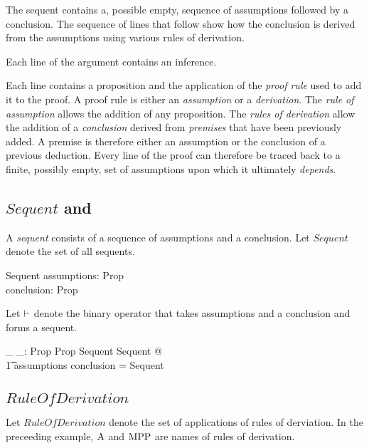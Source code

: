 \documentclass[11pt, oneside]{article}
\begin{document}
The sequent contains a, possible empty, sequence of assumptions followed by a conclusion.
The sequence of lines that follow show how the conclusion is derived from the assumptions using
various rules of derivation.

Each line of the argument contains an inference.

Each line contains a proposition and the application of the {\it proof rule} used to add it to the proof. 
A proof rule is either an {\it assumption} or a {\it derivation}.
The {\it rule of assumption} allows the addition of any proposition.
The {\it rules of derivation} allow the addition of a {\it conclusion} derived from {\it premises} that have been
previously added.
A premise is therefore either an assumption or the conclusion of a previous deduction.
Every line of the proof can therefore be traced back to a finite, possibly empty, set of assumptions upon
which it ultimately {\it depends}.

\subsection{$Sequent$ and }

A {\it sequent} consists of a sequence of assumptions and a conclusion.
Let $Sequent$ denote the set of all sequents.

\begin{schema}{Sequent}
	assumptions: \seq Prop \\
	conclusion: Prop
\end{schema}

Let $\mathbin{\vdash}$ denote the binary operator that takes assumptions and a conclusion and forms a sequent.

\begin{axdef}
	\_ \sequent \_: \seq Prop \cross Prop \fun Sequent
\where
	\forall Sequent @ \\
	\t1	assumptions \sequent conclusion = \theta Sequent
\end{axdef}

\subsection{$RuleOfDerivation$}

Let $RuleOfDerivation$ denote the set of applications of rules of derviation.
In the preceeding example, $\operatorname{A}$ and $\operatorname{MPP}$ are names of rules of derivation.

\begin{zed}
	[RuleOfDerivation]
\end{zed}
\end{document}
